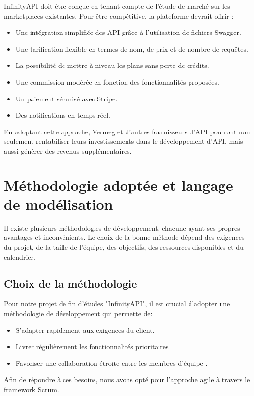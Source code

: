InfinityAPI doit être conçue en tenant compte de l'étude de marché sur les marketplaces existantes. Pour être compétitive, la plateforme devrait offrir :
\begin{itemize}
    \item Une intégration simplifiée des API grâce à l'utilisation de fichiers Swagger.
    \item Une tarification flexible en termes de nom, de prix et de nombre de requêtes.
    \item La possibilité de mettre à niveau les plans sans perte de crédits.
    \item Une commission modérée en fonction des fonctionnalités proposées.
    \item Un paiement sécurisé avec Stripe.
    \item Des notifications en temps réel.
\end{itemize}
En adoptant cette approche, Vermeg et d’autres fournisseurs d’API pourront non seulement rentabiliser leurs investissements dans le développement d’API, mais aussi générer des revenus supplémentaires.


\section{Méthodologie adoptée et langage de modélisation}
Il existe plusieurs méthodologies de développement, chacune ayant ses propres avantages et inconvénients. Le choix de la bonne méthode dépend des exigences du projet, de la taille de l'équipe, des objectifs, des ressources disponibles et du calendrier.

\subsection{Choix de la méthodologie  } 

Pour notre projet de fin d'études "InfinityAPI", il est crucial d'adopter une méthodologie de développement qui permette de: 
\begin{itemize}
    \item S'adapter rapidement aux exigences du client.
    \item Livrer régulièrement les fonctionnalités prioritaires 
    \item  Favoriser une collaboration étroite entre les membres d'équipe .
\end{itemize}
Afin de répondre à ces besoins, nous avons opté pour l’approche agile à travers le framework Scrum.

